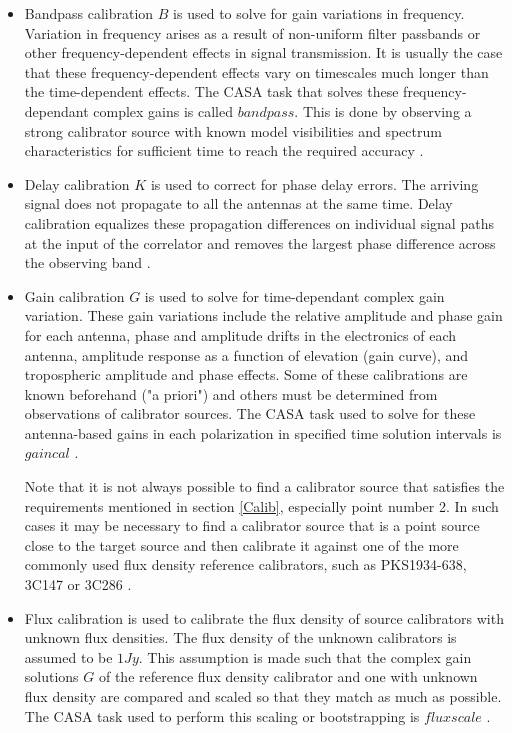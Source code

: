 \begin{itemize}

\item Bandpass calibration $B$ is used to solve for gain variations
in frequency. Variation in frequency arises as a result of non-uniform filter passbands or other frequency-dependent effects in signal transmission. It is usually the case that these frequency-dependent effects vary on timescales much longer than the time-dependent effects. The CASA task that solves these frequency-dependant complex gains is called $\textit{bandpass}$. This is done by observing a strong calibrator source with known model visibilities and spectrum characteristics for sufficient time to reach the required accuracy \citep{taylor1999synthesis}.

\item Delay calibration $K$ is used to correct for phase delay errors. The arriving signal does not propagate to all the antennas at the same time. Delay calibration equalizes these propagation differences on individual signal paths at the input of the correlator and removes the largest phase difference across the observing band \citep{taylor1999synthesis}.   

\item Gain calibration $G$ is used to solve for time-dependant complex gain variation. These gain variations include the relative amplitude and phase gain for each antenna, phase and amplitude drifts in the electronics of each antenna, amplitude response as a function of elevation (gain curve), and tropospheric amplitude and phase effects. Some of these calibrations are known beforehand ("a priori") and others must be determined from observations of calibrator sources. The CASA task used to solve for these antenna-based gains in each polarization in specified time solution intervals  is $\textit{gaincal}$ \citep{editioncasa}.  

Note that it is not always possible to find a calibrator source that satisfies the requirements mentioned in section \ref{Calib}, especially point number 2. In such cases it may be necessary to find a calibrator source that is a point source  close to the target source and then calibrate it against one of the more commonly used flux density reference calibrators, such as PKS1934-638, 3C147 or 3C286 \citep{thompson2001interferometry}. 

\item Flux calibration is used to calibrate the flux density of source calibrators with unknown flux densities. The flux density of the unknown calibrators is assumed to be $1Jy$. This assumption is made such that the complex gain solutions $G$ of the reference flux density calibrator and one with unknown flux density are compared and scaled so that they match as much as possible. The CASA task used to perform this scaling or bootstrapping is $\textit{fluxscale}$ \citep{editioncasa}.
\end{itemize}

